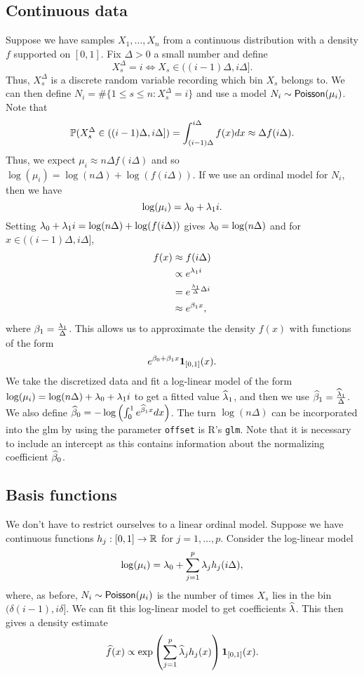 \subsection{Continuous data}
Suppose we have samples $X_1,\ldots,X_n$ from a continuous distribution with a density $f$ supported on $[0,1]$. Fix $\Delta >0$ a small number and define 
\[X^\Delta_s = i \Longleftrightarrow X_s \in ((i-1)\Delta,i\Delta]. \]
Thus, $X^\Delta_s$ is a discrete random variable recording which bin $X_s$ belongs to. We can then define $N_i = \#\{1\le s \le n : X_s^\Delta = i\}$ and use a model $N_i \sim \mathsf{Poisson}(\mu_i)$. Note that 
\[{\mathbb{P}}(X_s^\Delta \in ((i-1)\Delta,i\Delta]) = \int_{(i-1)\Delta}^{i\Delta} f(x)dx \approx \Delta f(i\Delta). \]
Thus, we expect $\mu_i \approx n \Delta f(i\Delta)$ and so $\log(\mu_i) = \log(n\Delta) + \log(f(i\Delta))$. If we use an ordinal model for $N_i$, then we have 
\[\log(\mu_i) = \lambda_0 + \lambda_1 i. \]
Setting $\lambda_0+\lambda_1 i = \log(n \Delta)+\log(f(i\Delta))$ gives $\lambda_0 =\log(n \Delta)$ and for $x \in ((i-1)\Delta, i\Delta]$, 
\begin{align*}
    f(x) &\approx f(i\Delta)\\
    & \propto e^{\lambda_1 i} \\
    &= e^{\frac{\lambda_1}{\Delta} \Delta i} \\
    & \approx e^{\beta_1 x}, \end{align*}
where $\beta_1 = \frac{\lambda_1}{\Delta}$. This allows us to approximate the density $f(x)$ with functions of the form \[e^{\beta_0 + \beta_1 x}{{\bf 1}}_{[0,1]}(x).\] We take the discretized data and fit a log-linear model of the form $\log(\mu_{i}) = \log(n \Delta)+\lambda_0+\lambda_1 i$ to get a fitted value $\widehat{\lambda}_1$, and then we use $\widehat{\beta}_1 = \frac{\widehat{\lambda}_1}{\Delta}$. We also define $\widehat{\beta}_0 = -\log\left(\int_0^1 e^{\widehat{\beta}_1 x}dx\right)$. The turn $\log(n \Delta)$ can be incorporated into the glm by using the parameter \texttt{offset} is R's \texttt{glm}. Note that it is necessary to include an intercept as this contains information about the normalizing coefficient $\widehat{\beta}_0$.

\subsection{Basis functions}
We don't have to restrict ourselves to a linear ordinal model. Suppose we have continuous functions $h_j:[0,1]\to {\mathbb R}$ for $j=1,\ldots,p$. Consider the log-linear model 
\[\log(\mu_i) = \lambda_0 + \sum_{j=1}^p \lambda_j h_j(i\Delta), \]
where, as before, $N_i \sim \mathsf{Poisson}(\mu_i)$ is the number of times $X_s$ lies in the bin $(\delta(i-1),i\delta]$. We can fit this log-linear model to get coefficients $\widehat{\lambda}$. This then gives a density estimate
\[\widehat{f}(x) \propto \exp\left(\sum_{j=1}^p \widehat{\lambda}_j h_j(x)\right){{\bf 1}}_{[0,1]}(x). \]
